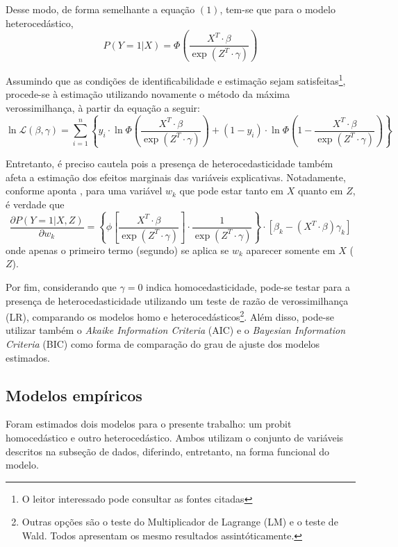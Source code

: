 \documentclass[12pt,
               openright,
               oneside,
               a4paper,
							 section=TITLE,     %
               subsection=Title,  %
               english,brazil]{article}
\begin{document}
Desse modo, de forma semelhante a equação $(1)$, tem-se que para o modelo heterocedástico,
\begin{equation}
P(Y=1|X) = \Phi \left( \frac{X^T \cdot \beta}{\exp(Z^T \cdot \gamma)}\right)
\end{equation}

Assumindo que as condições de identificabilidade e estimação sejam satisfeitas\footnote[5]{O leitor interessado pode consultar as fontes citadas}, procede-se à estimação utilizando novamente o método da máxima verossimilhança, à partir da equação a seguir:
\begin{equation}
\ln \mathcal{L}(\beta, \gamma) = \sum_{i=1}^n \left\{y_i \cdot \ln \Phi \left( \frac{X^T \cdot \beta}{\exp(Z^T \cdot \gamma)} \right) + (1-y_i) \cdot \ln \Phi \left( 1 - \frac{X^T \cdot \beta}{\exp(Z^T \cdot \gamma)} \right) \right\}
\end{equation}

Entretanto, é preciso cautela pois a presença de heterocedasticidade também afeta a estimação dos efeitos marginais das variáveis explicativas. Notadamente, conforme aponta , para uma variável $w_k$ que pode estar tanto em $X$ quanto em $Z$, é verdade que
\begin{equation}
\frac{\partial P(Y=1 |X,Z)}{\partial w_k} = \left\{ \phi \left[ \frac{X^T \cdot \beta}{\exp(Z^T \cdot \gamma)}\right] \cdot \frac{1}{\exp(Z^T \cdot \gamma)} \right\} \cdot [\beta_k - (X^T \cdot \beta)\gamma_k]   
\end{equation}
onde apenas o primeiro termo (segundo) se aplica se $w_k$ aparecer somente em $X$ ($Z$).

Por fim, considerando que $\gamma = 0$ indica homocedasticidade, pode-se testar para a presença de heterocedasticidade utilizando um teste de razão de verossimilhança (LR), comparando os modelos homo e heterocedásticos\footnote[6]{Outras opções são o teste do Multiplicador de Lagrange (LM) e o teste de Wald. Todos apresentam os mesmo resultados assintóticamente.}. Além disso, pode-se utilizar também o \textit{Akaike Information Criteria} (AIC) e o \textit{Bayesian Information Criteria} (BIC) como forma de comparação do grau de ajuste dos modelos estimados.

\subsection{Modelos empíricos}

Foram estimados dois modelos para o presente trabalho: um probit homocedástico e outro heterocedástico. Ambos utilizam o conjunto de variáveis descritos na subseção de dados, diferindo, entretanto, na forma funcional do modelo.
\end{document}
